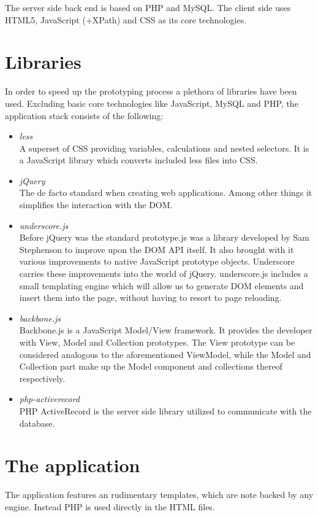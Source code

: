 The server side back end is based on PHP and MySQL. The client side uses
HTML5, JavaScript (+XPath) and CSS as its core technologies.

\section{Libraries}
In order to speed up the prototyping process a plethora of libraries have been
used. Excluding basic core technologies like JavaScript, MySQL and PHP, the
application stack consists of the following:
\begin{itemize}
	\item \emph{less}\\
	A superset of CSS providing variables, calculations and nested selectors. It
	is a JavaScript library which converts included less files into CSS.
	\item \emph{jQuery}\\
	The de facto standard when creating web applications. Among other things it
	simplifies the interaction with the DOM.
	\item \emph{underscore.js}\\
	Before jQuery was the standard prototype.js was a library developed by
	Sam Stephenson to improve upon the DOM API itself. It also brought with it
	various improvements to native JavaScript prototype objects. Underscore
	carries these improvements into the world of jQuery. underscore.js includes a
	small templating engine which will allow us to generate DOM elements and
	insert them into the page, without having to resort to page reloading.
	\item \emph{backbone.js}\\
	Backbone.js is a JavaScript Model/View framework. It provides the developer
	with View, Model and Collection prototypes. The View prototype can be
	considered analogous to the aforementioned ViewModel, while the Model and
	Collection part make up the Model component and collections thereof
	respectively.
	\item \emph{php-activerecord}\\
	PHP ActiveRecord is the server side library utilized to communicate with the
	database.
\end{itemize}

\section{The application}
The application features an rudimentary templates, which are note backed by any
engine. Instead PHP is used directly in the HTML files.
